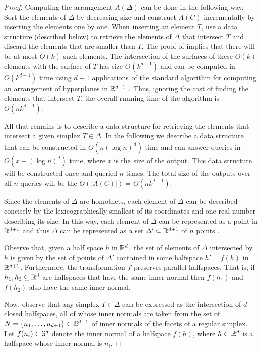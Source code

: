 \documentclass{llncs}
\begin{document}
\begin{proof}
  Computing the arrangement $A(\Delta)$ can be done in the following way.
  Sort the elements of $\Delta$ by decreasing size and construct $A(C)$
  incrementally by inserting the elements one by one.  When inserting
  an element $T$, use a data structure (described below) to retrieve
  the elements of $\Delta$ that intersect $T$ and discard the elements
  that are smaller than $T$.  The proof of  implies
  that there will be at most $O(k)$ such elements.  The intersection
  of the surfaces of these $O(k)$ elements with the surface of $T$ has
  size $O(k^{d-1})$ and can be computed in $O(k^{d-1})$ time using $d+1$
  applications of the standard algorithm for computing an arrangement
  of hyperplanes in $\mathbb{R}^{d-1}$ \cite{eos86,ess93}.  Thus, ignoring the
  cost of finding the elements that intersect $T$, the overall running
  time of the algorithm is $O(nk^{d-1})$.

  All that remains is to describe a data structure for retrieving the
  elements that intersect a given simplex $T\in\Delta$.  In the following
  we describe a data structure that can be constructed in $O(n(\log
  n)^{d})$ time and can answer queries in $O(x + (\log n)^{d})$ time,
  where $x$ is the size of the output.  This data structure will be
  constructed once and queried $n$ times.  The total size of the outputs
  over all $n$ queries will be the $O(|A(C)|)=O(nk^{d-1})$.

  Since the elements of $\Delta$ are homothets, each element of $\Delta$
  can be described concisely by the lexicographically smallest of its
  coordinates and one real number describing its size. In this way,
  each element of $\Delta$ can be represented as a point in $\mathbb{R}^{d+1}$
  and thus $\Delta$ can be represented as a set $\Delta'\subseteq\mathbb{R}^{d+1}$
  of $n$ points .

  Observe that, given a half space $h$ in $\mathbb{R}^d$, the set of elements of
  $\Delta$ intersected by $h$ is given by the set of points of $\Delta'$
  contained in some halfspace $h'=f(h)$ in $\mathbb{R}^{d+1}$.  Furthermore,
  the transformation $f$ preserves parallel halfspaces.  That is,
  if $h_1,h_2\subseteq{\mathbb{R}^d}$ are halfspaces that have the same inner
  normal then $f(h_1)$ and $f(h_2)$ also have the same inner normal.

  Now, observe that any simplex $T\in\Delta$ can be expressed as the
  intersection of $d$ closed halfspaces, all of whose inner normals are
  taken from the set of $N=\{n_1,\ldots,n_{d+1}\}\subset \mathbb{S}^{d-1}$ of
  inner normals of the facets of a regular simplex.  Let $f(n_i)\in\mathbb{S}^d$
  denote the inner normal of a halfspace $f(h)$, where $h\subset\mathbb{R}^d$
  is a halfspace whose inner normal is $n_i$.


\end{proof}
\end{document}
